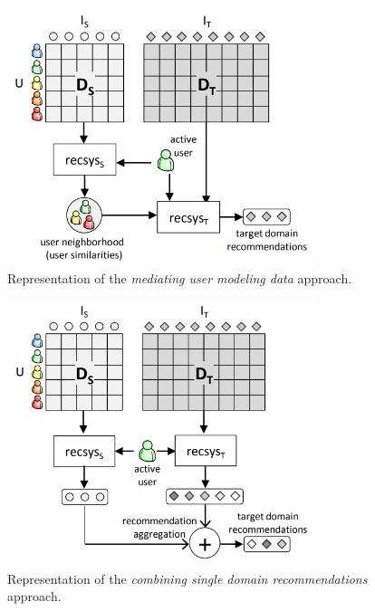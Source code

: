 \begin{figure}[H]
\centering
\includegraphics[width=0.8\textwidth]{pictures/mediating-user-modeling-data}
\caption{Representation of the \textit{mediating user modeling data} approach. \cite{10.1007/978-1-4899-7637-6_27}}
\label{fg:mediating-user-modeling-data}
\end{figure}
\begin{figure}[H]
\centering
\includegraphics[width=0.8\textwidth]{pictures/combining-single-domain-recommendations}
\caption{Representation of the \textit{combining single domain recommendations} approach. \cite{10.1007/978-1-4899-7637-6_27}}
\label{fg:combining-single-domain-recommendations}
\end{figure}

